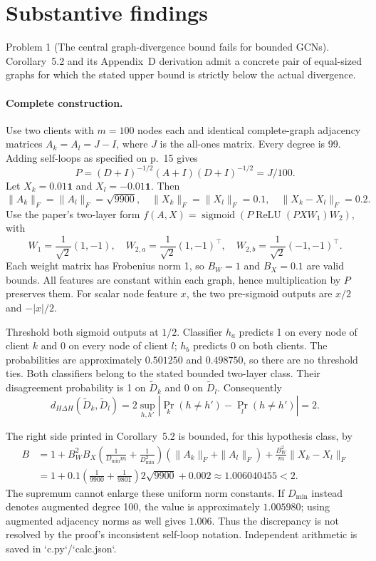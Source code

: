 \documentclass[10pt]{article}
\begin{document}
\section*{Substantive findings}
Problem 1 (The central graph-divergence bound fails for bounded GCNs).  Corollary 5.2 and its Appendix D derivation admit a concrete pair of equal-sized graphs for which the stated upper bound is strictly below the actual divergence.\par
\paragraph*{Complete construction.}\mbox{}\par
Use two clients with \(m=100\) nodes each and identical complete-graph adjacency matrices \(A_k=A_l=J-I\), where \(J\) is the all-ones matrix. Every degree is 99. Adding self-loops as specified on p. 15 gives \[P=(D+I)^{-1/2}(A+I)(D+I)^{-1/2}=J/100.\] Let \(X_k=0.01\mathbf1\) and \(X_l=-0.01\mathbf1\). Then \[\|A_k\|_F=\|A_l\|_F=\sqrt{9900},\quad
 \|X_k\|_F=\|X_l\|_F=0.1,\quad
 \|X_k-X_l\|_F=0.2.\] Use the paper’s two-layer form \(f(A,X)=\operatorname{sigmoid}(P\operatorname{ReLU}(PXW_1)W_2)\), with \[W_1=\frac1{\sqrt2}(1,-1),\quad
 W_{2,a}=\frac1{\sqrt2}(1,-1)^\top,\quad
 W_{2,b}=\frac1{\sqrt2}(-1,-1)^\top.\] Each weight matrix has Frobenius norm 1, so \(B_W=1\) and \(B_X=0.1\) are valid bounds. All features are constant within each graph, hence multiplication by \(P\) preserves them. For scalar node feature \(x\), the two pre-sigmoid outputs are \(x/2\) and \(-|x|/2\).\par
Threshold both sigmoid outputs at \(1/2\). Classifier \(h_a\) predicts 1 on every node of client \(k\) and 0 on every node of client \(l\); \(h_b\) predicts 0 on both clients. The probabilities are approximately \(0.501250\) and \(0.498750\), so there are no threshold ties. Both classifiers belong to the stated bounded two-layer class. Their disagreement probability is 1 on \(\widetilde D_k\) and 0 on \(\widetilde D_l\). Consequently \[d_{H\Delta H}(\widetilde D_k,\widetilde D_l)
 =2\sup_{h,h'}|\Pr_k(h\ne h')-\Pr_l(h\ne h')|=2.\]\par
The right side printed in Corollary 5.2 is bounded, for this hypothesis class, by \[\begin{aligned}
 B&=1+B_W^2B_X
 \left(\frac1{D_{\min}m}+\frac1{D_{\min}^2}\right)
 (\|A_k\|_F+\|A_l\|_F)
 +\frac{B_W^2}{m}\|X_k-X_l\|_F\\
 &=1+0.1\left(\frac1{9900}+\frac1{9801}\right)
       2\sqrt{9900}+0.002
 \approx1.006040455<2.\end{aligned}\] The supremum cannot enlarge these uniform norm constants. If \(D_{\min}\) instead denotes augmented degree 100, the value is approximately \(1.005980\); using augmented adjacency norms as well gives \(1.006\). Thus the discrepancy is not resolved by the proof’s inconsistent self-loop notation. Independent arithmetic is saved in `c.py`/`calc.json`.\par
\end{document}
